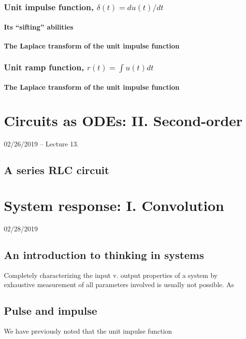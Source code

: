 \documentclass[11pt]{book}
\begin{document}
\subsection{Unit impulse function, $\delta(t) = du(t)/dt$}
\subsubsection{Its ``sifting'' abilities}
\subsubsection{The Laplace transform of the unit impulse function}
\subsection{Unit ramp function, $r(t) = \int u(t)dt $}
\subsubsection{The Laplace transform of the unit impulse function}



\chapter{Circuits as ODEs: II. Second-order}
02/26/2019 – Lecture 13. 
\section{A series RLC circuit}



\chapter{System response: I. Convolution}
02/28/2019
\minitoc
\newpage
\section{An introduction to thinking in systems}
Completely characterizing the input v. output properties of a system by exhaustive measurement of all parameters involved is usually not possible. As

\section{Pulse and impulse}
We have previously noted that the unit impulse function 
\end{document}
